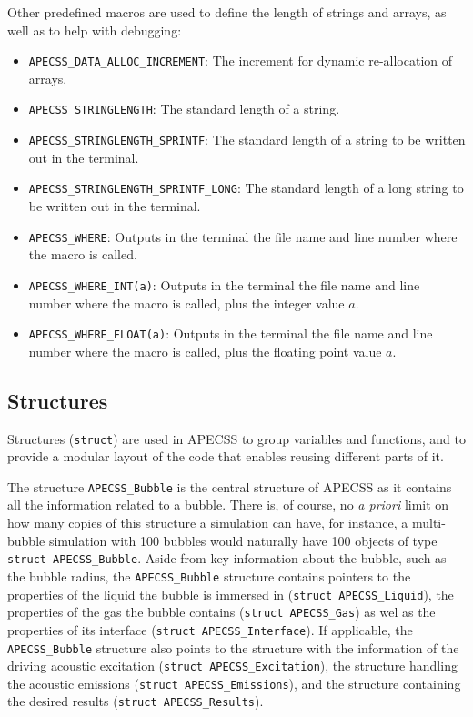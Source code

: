 Other predefined macros are used to define the length of strings and arrays, as well as to help with debugging:\vspace{-1em}
\begin{itemize}[noitemsep]
  \item {\tt APECSS\_DATA\_ALLOC\_INCREMENT}: The increment for dynamic re-allocation of arrays.
  \item {\tt APECSS\_STRINGLENGTH}: The standard length of a string.
  \item {\tt APECSS\_STRINGLENGTH\_SPRINTF}: The standard length of a string to be written out in the terminal.
  \item {\tt APECSS\_STRINGLENGTH\_SPRINTF\_LONG}: The standard length of a long string to be  written out in the terminal.
  \item {\tt APECSS\_WHERE}: Outputs in the terminal the file name and line number where the macro is called.
  \item {\tt APECSS\_WHERE\_INT(a)}: Outputs in the terminal the file name and line number where the macro is called, plus the integer value $a$.
  \item {\tt APECSS\_WHERE\_FLOAT(a)}: Outputs in the terminal the file name and line number where the macro is called, plus the floating point value $a$.
\end{itemize}


\subsection{Structures}

Structures ({\tt struct}) are used in APECSS to group variables and functions, and to provide a modular layout of the code that enables reusing different parts of it.

The structure {\tt APECSS\_Bubble} is the central structure of APECSS as it contains all the information related to a bubble. There is, of course, no {\it a priori} limit on how many copies of this structure a simulation can have, for instance, a multi-bubble simulation with 100 bubbles would naturally have 100 objects of type {\tt struct APECSS\_Bubble}. Aside from key information about the bubble, such as the bubble radius, the {\tt APECSS\_Bubble} structure contains pointers to the properties of the liquid the bubble is immersed in ({\tt struct APECSS\_Liquid}), the properties of the gas the bubble contains ({\tt struct APECSS\_Gas}) as wel as the properties of its interface ({\tt struct APECSS\_Interface}). If applicable, the {\tt APECSS\_Bubble} structure also points to the structure with the information of the driving acoustic excitation ({\tt struct APECSS\_Excitation}), the structure handling the acoustic emissions ({\tt struct APECSS\_Emissions}), and the structure containing the desired results ({\tt struct APECSS\_Results}). 

